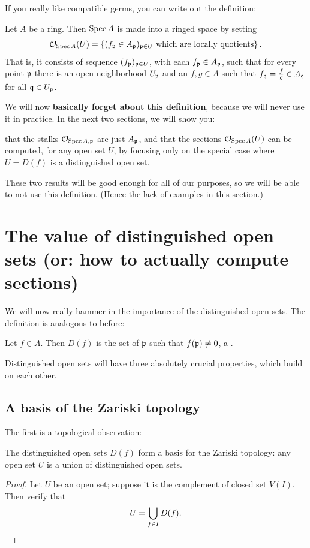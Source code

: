 If you really like compatible germs,
you can write out the definition:
\begin{definition}
	Let $A$ be a ring.
	Then $\operatorname{Spec} A$ is made into a ringed space by setting
	\[ \mathcal O_{\operatorname{Spec} A}(U)
		= \left\{ (f_\mathfrak p \in A_\mathfrak p)_{\mathfrak p \in U}
		\text{ which are locally quotients} \right\}. \]
	That is, it consists of sequence $(f_\mathfrak p)_{\mathfrak p \in U}$, with
	each $f_\mathfrak p \in A_\mathfrak p$, such that for every point $\mathfrak p$ there
	is an open neighborhood $U_\mathfrak p$ and an $f,g \in A$ such that
	$f_\mathfrak q = \frac fg \in A_\mathfrak q$ for all $\mathfrak q \in U_\mathfrak p$.
\end{definition}

We will now \textbf{basically forget about this definition},
because we will never use it in practice.
In the next two sections, we will show you:
\begin{itemize}
	\ii that the stalks $\mathcal O_{\operatorname{Spec} A, \mathfrak p}$ are just $A_\mathfrak p$, and
	\ii that the sections $\mathcal O_{\operatorname{Spec} A}(U)$
	can be computed, for any open set $U$,
	by focusing only on the special case where $U = D(f)$
	is a distinguished open set.
\end{itemize}
These two results will be good enough for all of our purposes,
so we will be able to not use this definition.
(Hence the lack of examples in this section.)

\section{The value of distinguished open sets (or: how to actually compute sections)}

We will now really hammer in the importance of
the distinguished open sets.
The definition is analogous to before:
\begin{definition}
	Let $f \in A$.
	Then $D(f)$ is the set of $\mathfrak p$ such that $f(\mathfrak p) \neq 0$,
	a .
\end{definition}
Distinguished open sets will have three absolutely crucial properties,
which build on each other.

\subsection{A basis of the Zariski topology}
The first is a topological observation:
\begin{theorem}
	\label{thm:distinguished_base}
	The distinguished open sets $D(f)$
	form a basis for the Zariski topology:
	any open set $U$ is a union of distinguished open sets.
\end{theorem}
\begin{proof}
	Let $U$ be an open set;
	suppose it is the complement of closed set $V(I)$.
	Then verify that \[ U = \bigcup_{f \in I} D(f). \qedhere \]
\end{proof}

